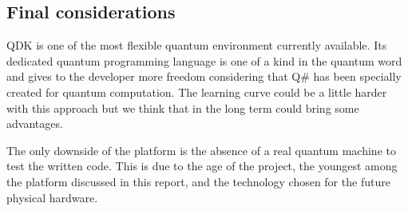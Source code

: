 \documentclass[main.tex]{subfiles}
\begin{document}
	\subsection{Final considerations}
	QDK is one of the most flexible quantum environment currently available. Its dedicated quantum programming language is one of a kind in the quantum word and gives to the developer more freedom considering that Q\# has been specially created for quantum computation. The learning curve could be a little harder with this approach but we think that in the long term could bring some advantages.
	
	The only downside of the platform is the absence of a real quantum machine to test the written code. This is due to the age of the project, the youngest among the platform discussed in this report, and the technology chosen for the future physical hardware.
\end{document}
